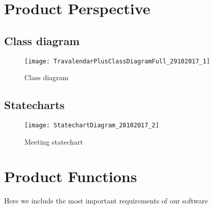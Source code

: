 \documentclass[a4paper,leqno]{book}
\begin{document}
\newpage
\section{Product Perspective}

\subsection{Class diagram}
\begin{figure}[!h]
	\begin{center}
		\texttt{[image: TravalendarPlusClassDiagramFull\_29102017\_1]}
	\end{center}
	\caption{Class diagram}
\end{figure}

\newpage
\subsection{Statecharts}
\begin{figure}[!h]
	\begin{centering}
		\texttt{[image: StatechartDiagram\_28102017\_2]}
		\end{centering}
	\caption{Meeting statechart}
\end{figure}

\newpage
\section{Product Functions}
Here we include the most important requirements of our software
\end{document}
